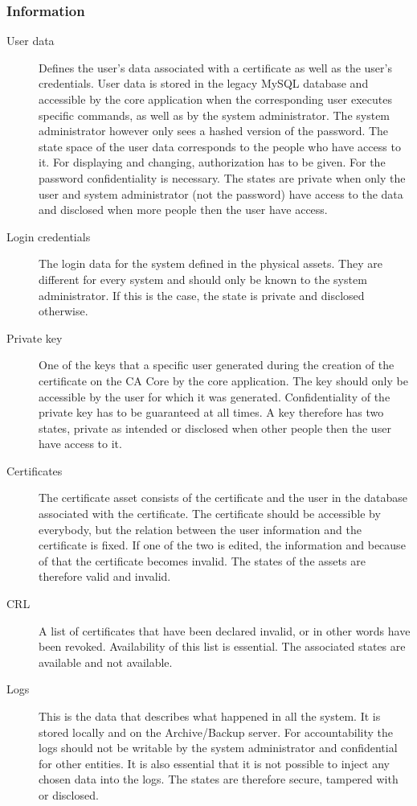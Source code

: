 \documentclass[a4paper, toc=index, 12pt, DIV14, twoside, BCOR2cm, headsepline, numbers=noenddot, bibliography=totoc]{report}
\begin{document}
\subsubsection{Information}
\begin{description}
\item[User data ] Defines the user's data associated with a certificate as well as the user's credentials. User data is stored in the legacy MySQL database and accessible by the core application when the corresponding user executes specific commands, as well as by the system administrator. The system administrator however only sees a hashed version of the password. The state space of the user data corresponds to the people who have access to it. For displaying and changing, authorization has to be given. For the password confidentiality is necessary. The states are private when only the user and system administrator (not the password) have access to the data and disclosed when more people then the user have access.
\item[Login credentials ] The login data for the system defined in the physical assets. They are different for every system and should only be known to the system administrator. If this is the case, the state is private and disclosed otherwise.
\item[Private key ] One of the keys that a specific user generated during the creation of the certificate on the CA Core by the core application. The key should only be accessible by the user for which it was generated. Confidentiality of the private key has to be guaranteed at all times. A key therefore has two states, private as intended or disclosed when other people then the user have access to it.
\item[Certificates ] The certificate asset consists of the certificate and the user in the database associated with the certificate. The certificate should be accessible by everybody, but the relation between the user information and the certificate is fixed. If one of the two is edited, the information and because of that the certificate becomes invalid. The states of the assets are therefore valid and invalid.
\item[CRL ] A list of certificates that have been declared invalid, or in other words have been revoked. Availability of this list is essential. The associated states are available and not available.
\item[Logs ] This is the data that describes what happened in all the system. It is stored locally and on the Archive/Backup server. For accountability the logs should not be writable by the system administrator and confidential for other entities. It is also essential that it is not possible to inject any chosen data into the logs. The states are therefore secure, tampered with or disclosed.

\end{description}
\end{document}
